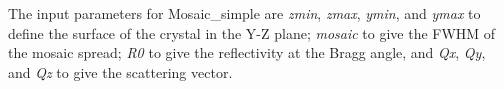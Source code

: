 The input parameters for Mosaic\_simple are \textit{zmin},
\textit{zmax}, \textit{ymin}, and \textit{ymax} to define the surface of
the crystal in the Y-Z plane; \textit{mosaic} to give the FWHM of the
mosaic spread; \textit{R0} to give the reflectivity at the Bragg angle,
and \textit{Qx}, \textit{Qy}, and \textit{Qz} to give the scattering
vector.

